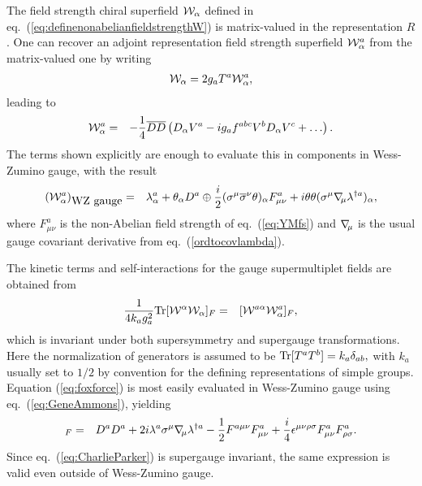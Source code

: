 \documentclass[11pt]{article}
\def\BDminus{-}
\def\BDminus{+}
\def\BDminus{\ominus}
\def\BDminus{\oplus}
\newcommand{\nablasubmu}{\nabla\hspace{-2pt}{}_\mu}
\def\beq{\begin{eqnarray}}
\def\eeq{\end{eqnarray}}
\def\sigmabar{\overline\sigma}
\def\Dcon{\overline D}
\begin{document}
The field strength chiral superfield ${\cal W}_\alpha$ defined in 
eq.~(\ref{eq:definenonabelianfieldstrengthW}) 
is matrix-valued in the representation $R$. One can recover an adjoint representation
field strength superfield ${\cal W}^a_\alpha$ from the matrix-valued
one by writing
\beq
{\cal W}_\alpha = 2 g_a T^a {\cal W}^a_\alpha ,
\eeq
leading to
\beq
{\cal W}^a_\alpha &=& 
-\frac{1}{4} \Dcon\Dcon \left (
D_\alpha V^a - i g_a f^{abc} V^b D_\alpha V^c + \ldots \right ) .
\eeq
The terms shown explicitly are enough to evaluate this in components in 
Wess-Zumino gauge, with the result
\beq
({\cal W}^a_\alpha)_{\mbox{WZ gauge}}
&=&
\lambda^a_\alpha + \theta_\alpha D^a 
\BDminus \frac{i}{2} (\sigma^\mu 
\sigmabar^\nu \theta)_\alpha F^a_{\mu\nu} 
+ i \theta\theta (\sigma^\mu \nablasubmu \lambda^{\dagger a})_\alpha
,
\label{eq:GeneAmmons}
\eeq
where $F^a_{\mu\nu}$ is the non-Abelian field strength of eq.~(\ref{eq:YMfs})
and $\nablasubmu$ is the usual gauge covariant derivative from eq.~(\ref{ordtocovlambda}).

The kinetic terms and self-interactions for the gauge supermultiplet fields are obtained
from 
\beq
\frac{1}{4 k_a g_a^2} {\rm Tr}[{\cal W}^{\alpha} {\cal W}_\alpha]_F &=&
[{\cal W}^{a\alpha} {\cal W}^a_\alpha]_F,
\label{eq:foxforce}
\eeq
which is invariant under both supersymmetry and supergauge transformations.
Here the normalization of generators is assumed to be
$
{\rm Tr}[T^a T^b] = k_a \delta_{ab},
$
with $k_a$ usually set to $1/2$ by convention for the 
defining representations of simple groups.
Equation (\ref{eq:foxforce}) is most easily
evaluated in Wess-Zumino gauge using eq.~(\ref{eq:GeneAmmons}), yielding
\beq
[{\cal W}^{a\alpha} {\cal W}^a_\alpha]_F &=& D^{a}D^a +
2 i \lambda^a \sigma^\mu \nablasubmu \lambda^{\dagger a}
-\frac{1}{2} F^{a\mu\nu} F^a_{\mu\nu} 
+ \frac{i}{4} \epsilon^{\mu\nu\rho\sigma} F^a_{\mu\nu} F^a_{\rho\sigma} .
\label{eq:CharlieParker}
\eeq 
Since eq.~(\ref{eq:CharlieParker}) is supergauge invariant, the same expression is valid 
even outside of Wess-Zumino gauge.
\end{document}
